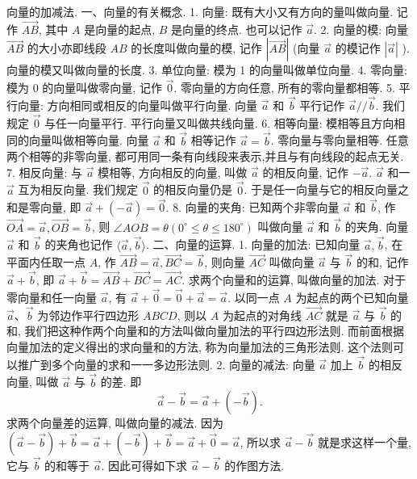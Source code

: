 
向量的加减法.
一、向量的有关概念.
1. 向量: 既有大小又有方向的量叫做向量.
记作 $\overrightarrow{A B}$, 其中 $A$ 是向量的起点, $B$ 是向量的终点.
也可以记作 $\vec{a}$.
2. 向量的模: 向量 $\overrightarrow{A B}$ 的大小亦即线段 $A B$ 的长度叫做向量的模, 记作 $|\overrightarrow{A B}|$ (向量 $\vec{a}$ 的模记作 $|\vec{a}|$ ). 向量的模又叫做向量的长度.
3. 单位向量: 模为 1 的向量叫做单位向量.
4. 零向量: 模为 0 的向量叫做零向量, 记作 $\overrightarrow{0}$. 零向量的方向任意, 所有的零向量都相等.
5. 平行向量: 方向相同或相反的向量叫做平行向量.
向量 $\vec{a}$ 和 $\vec{b}$ 平行记作 $\vec{a} / / \vec{b}$. 我们规定 $\overrightarrow{0}$ 与任一向量平行.
平行向量又叫做共线向量.
6. 相等向量: 模相等且方向相同的向量叫做相等向量.
向量 $\vec{a}$ 和 $\vec{b}$ 相等记作 $\vec{a}=\vec{b}$. 零向量与零向量相等.
任意两个相等的非零向量, 都可用同一条有向线段来表示,并且与有向线段的起点无关.
7. 相反向量: 与 $\vec{a}$ 模相等, 方向相反的向量, 叫做 $\vec{a}$ 的相反向量, 记作 $-\vec{a}$. $\vec{a}$ 和一 $\vec{a}$ 互为相反向量.
我们规定 $\overrightarrow{0}$ 的相反向量仍是 $\overrightarrow{0}$. 于是任一向量与它的相反向量之和是零向量, 即 $\vec{a}+(-\vec{a})=\overrightarrow{0}$.
8. 向量的夹角: 已知两个非零向量 $\vec{a}$ 和 $\vec{b}$, 作 $\overrightarrow{O A}=\vec{a}, \overrightarrow{O B}=\vec{b}$, 则 $\angle A O B=\theta\left(0^{\circ} \leqslant \theta \leqslant 180^{\circ}\right)$ 叫做向量 $\vec{a}$ 和 $\vec{b}$ 的夹角.
向量 $\vec{a}$ 和 $\vec{b}$ 的夹角也记作 $\langle\vec{a}, \vec{b}\rangle$.
二、向量的运算.
1. 向量的加法: 已知向量 $\vec{a}, \vec{b}$, 在平面内任取一点 $A$, 作 $\overrightarrow{A B}=\vec{a}, \overrightarrow{B C}= \vec{b}$, 则向量 $\overrightarrow{A C}$ 叫做向量 $\vec{a}$ 与 $\vec{b}$ 的和, 记作 $\vec{a}+\vec{b}$, 即 $\vec{a}+\vec{b}=\overrightarrow{A B}+\overrightarrow{B C}=\overrightarrow{A C}$.
求两个向量和的运算, 叫做向量的加法.
对于零向量和任一向量 $\vec{a}$, 有 $\vec{a}+\overrightarrow{0}=\overrightarrow{0}+\vec{a}=\vec{a}$.
以同一点 $A$ 为起点的两个已知向量 $\vec{a} 、 \vec{b}$ 为邻边作平行四边形 $A B C D$, 则以 $A$ 为起点的对角线 $\overrightarrow{A C}$ 就是 $\vec{a}$ 与 $\vec{b}$ 的和, 我们把这种作两个向量和的方法叫做向量加法的平行四边形法则.
而前面根据向量加法的定义得出的求向量和的方法, 称为向量加法的三角形法则.
这个法则可以推广到多个向量的求和一一多边形法则.
2. 向量的减法: 向量 $\vec{a}$ 加上 $\vec{b}$ 的相反向量, 叫做 $\vec{a}$ 与 $\vec{b}$ 的差.
即
$$
\vec{a}-\vec{b}=\vec{a}+(-\vec{b}) .
$$
求两个向量差的运算, 叫做向量的减法.
因为 $(\vec{a}-\vec{b})+\vec{b}=\vec{a}+(-\vec{b})+\vec{b}=\vec{a}+\overrightarrow{0}=\vec{a}$, 所以求 $\vec{a}-\vec{b}$ 就是求这样一个量, 它与 $\vec{b}$ 的和等于 $\vec{a}$. 因此可得如下求 $\vec{a}-\vec{b}$ 的作图方法.
